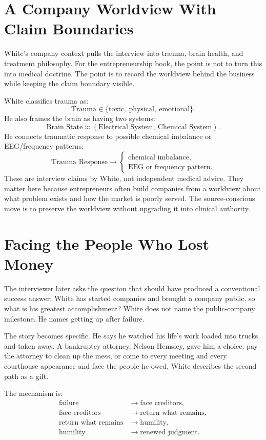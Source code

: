 \documentclass[11pt,oneside]{book}
\begin{document}
\section{A Company Worldview With Claim Boundaries}

White's company context pulls the interview into trauma, brain health, and treatment philosophy. For the entrepreneurship book, the point is not to turn this into medical doctrine. The point is to record the worldview behind the business while keeping the claim boundary visible.

White classifies trauma as:
\[
\text{Trauma}\in
\{\text{toxic},\ \text{physical},\ \text{emotional}\}.
\]
He also frames the brain as having two systems:
\[
\text{Brain State}\approx
(\text{Electrical System},\ \text{Chemical System}).
\]
He connects traumatic response to possible chemical imbalance or EEG/frequency patterns:
\[
\text{Trauma Response}
\longrightarrow
\begin{cases}
\text{chemical imbalance},\\
\text{EEG or frequency pattern}.
\end{cases}
\]
These are interview claims by White, not independent medical advice. They matter here because entrepreneurs often build companies from a worldview about what problem exists and how the market is poorly served. The source-conscious move is to preserve the worldview without upgrading it into clinical authority.

\section{Facing the People Who Lost Money}

The interviewer later asks the question that should have produced a conventional success answer: White has started companies and brought a company public, so what is his greatest accomplishment? White does not name the public-company milestone. He names getting up after failure.

The story becomes specific. He says he watched his life's work loaded into trucks and taken away. A bankruptcy attorney, Nelson Hemsley, gave him a choice: pay the attorney to clean up the mess, or come to every meeting and every courthouse appearance and face the people he owed. White describes the second path as a gift.

The mechanism is:
\begin{align}
\text{failure}
&\longrightarrow \text{face creditors},\\
\text{face creditors}
&\longrightarrow \text{return what remains},\\
\text{return what remains}
&\longrightarrow \text{humility},\\
\text{humility}
&\longrightarrow \text{renewed judgment}.
\end{align}
\end{document}
